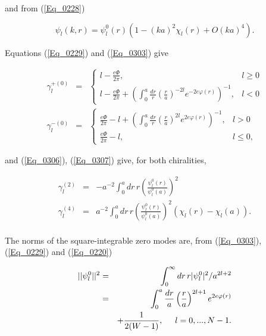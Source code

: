 \documentclass[a4paper,twocolumn,showpacs,preprintnumbers,amsmath,amssymb]{revtex4}
\begin{document}
\noindent
and from (\ref{Eq_0228})

\begin{equation}
\label{Eq_0307}
\psi_l(k,r) = \psi^0_l(r) (1 - (ka)^2 \chi_l(r) + O(ka)^4).
\end{equation}

\noindent
Equations (\ref{Eq_0229}) and (\ref{Eq_0303}) give

\begin{widetext}
\begin{eqnarray}
\nonumber
\gamma^{+ (0)}_l &=&
\begin{cases}
\displaystyle
l - \frac{e\Phi}{2\pi}, & l \geq 0\\[3mm]
\displaystyle
l - \frac{e\Phi}{2\pi}
  + \left(\int^a_0 \frac{dr}{r} \left(\frac{r}{a}\right)^{-2l}
  e^{-2e \varphi(r)} \right)^{-1}, & l < 0
\end{cases}\\[3mm]
\label{Eq_0308}
\gamma^{- (0)}_l &=&
\begin{cases}
\displaystyle
\frac{e\Phi}{2\pi} - l
  + \left(\int^a_0 \frac{dr}{r} \left(\frac{r}{a}\right)^{2l}
  e^{2e \varphi(r)} \right)^{-1}, & l > 0\\[3mm]
\displaystyle
\frac{e\Phi}{2\pi} - l, & l \leq 0,
\end{cases}
\end{eqnarray}
\end{widetext}

\noindent
and (\ref{Eq_0306}), (\ref{Eq_0307}) give, for both chiralities,

\begin{eqnarray}
\label{Eq_0309}
\nonumber
\gamma^{(2)}_l &=& - a^{-2} \int^a_0 dr \, r
  \left( \frac{\psi^0_l(r)}{\psi^0_l(a)} \right)^2\\
\nonumber
\gamma^{(4)}_l &=& a^{-2} \int^a_0 dr \, r
  \left( \frac{\psi^0_l(r)}{\psi^0_l(a)} \right)^2
  (\chi_l(r) - \chi_l(a)).\\
\end{eqnarray}

\noindent
The norms of the square-integrable zero modes are, from (\ref{Eq_0303}), (\ref{Eq_0229})
and (\ref{Eq_0220})

\begin{eqnarray}
\label{Eq_0310}
\nonumber
||\psi^0_l||^2
  &=& \int^\infty_0 dr \, r |\psi^0_l|^2 / a^{2l+2}\\
\nonumber
  &=& \int^a_0 \frac{dr}{a} \left(\frac{r}{a}\right)^{2l+1}
      e^{2e \varphi(r)}\\
  & & + \frac{1}{2(W-1)}, \hspace{5mm} l = 0, ..., N-1.
\end{eqnarray}
\end{document}
